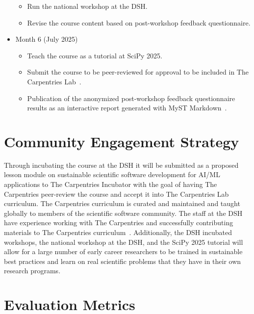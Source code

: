 \documentclass[letterpaper, 11pt]{article}
\begin{document}
\begin{itemize}
\begin{itemize}
      \item Run the national workshop at the DSH.
      \item Revise the course content based on post-workshop feedback questionnaire.
    \end{itemize}
  \item Month 6 (July 2025)
    \begin{itemize}
      \item Teach the course as a tutorial at SciPy 2025.
      \item Submit the course to be peer-reviewed for approval to be included in The Carpentries Lab~\cite{carpentries_lab}.
      \item Publication of the anonymized post-workshop feedback questionnaire results as an interactive report generated with MyST Markdown~\cite{executable_books_community}.
    \end{itemize}
\end{itemize}

\section{Community Engagement Strategy}


Through incubating the course at the DSH it will be submitted as a proposed lesson module on sustainable scientific software development for AI/ML applications to The Carpentries Incubator with the goal of having The Carpentries peer-review the course and accept it into The Carpentries Lab curriculum.
The Carpentries curriculum is curated and maintained and taught globally to members of the scientific software community.
The staff at the DSH have experience working with The Carpentries and successfully contributing materials to The Carpentries curriculum~\cite{backhaus_2024_14360351}.
Additionally, the DSH incubated workshops, the national workshop at the DSH, and the SciPy 2025 tutorial will allow for a large number of early career researchers to be trained in sustainable best practices and learn on real scientific problems that they have in their own research programs.

\section{Evaluation Metrics}
\end{document}

